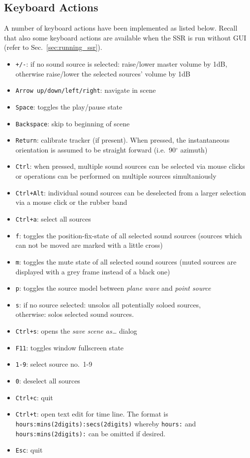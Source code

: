 \subsection{Keyboard Actions}
\label{sec:keyboard_actions}
%
A number of keyboard actions have been implemented as listed below. Recall that also
some keyboard actions are available when the SSR is run without GUI (refer to 
Sec.~\ref{sec:running_ssr}).
%
\begin{itemize}
\item[] \texttt{+/-}: if no sound source is selected: raise/lower master volume by 1dB,\\
  otherwise raise/lower the selected sources' volume by 1dB
\item[] \texttt{Arrow up/down/left/right}: navigate in scene
\item[] \texttt{Space}: toggles the play/pause state
\item[] \texttt{Backspace}: skip to beginning of scene
\item[] \texttt{Return}: calibrate tracker (if present). When pressed, the instantaneous\\
  orientation is assumed to be straight forward (i.e.~90$^\circ$ azimuth)
\item[] \texttt{Ctrl}: when pressed, multiple sound sources can be
selected via mouse clicks or operations can be performed on multiple sources simultaniously
\item[] \texttt{Ctrl+Alt}: individual sound sources can be
deselected from a larger selection via a mouse click or the rubber band
\item[] \texttt{Ctrl+a}: select all sources
\item[] \texttt{f}: toggles the position-fix-state of all selected sound sources (sources
  which can not be moved are marked with a little cross)
\item[] \texttt{m}: toggles the mute state of all selected sound sources (muted sources
  are displayed with a grey frame instead of a black one)
\item[] \texttt{p}: toggles the source model between \emph{plane wave} and \emph{point source}
\item[] \texttt{s}: if no source selected: unsolos all potentially soloed sources,\\
  otherwise: solos selected sound sources.
\item[] \texttt{Ctrl+s}: opens the \emph{save scene as\dots} dialog
\item[] \texttt{F11}: toggles window fullscreen state
\item[] \texttt{1-9}: select source no.~1-9
\item[] \texttt{0}: deselect all sources
\item[] \texttt{Ctrl+c}: quit
\item[] \texttt{Ctrl+t}: open text edit for time line. The format is
\texttt{hours:mins(2digits):secs(2digits)} whereby \texttt{hours:}
and \texttt{hours:mins(2digits):} can be omitted if desired.
\item[] \texttt{Esc}: quit
\end{itemize}
%
%
%
